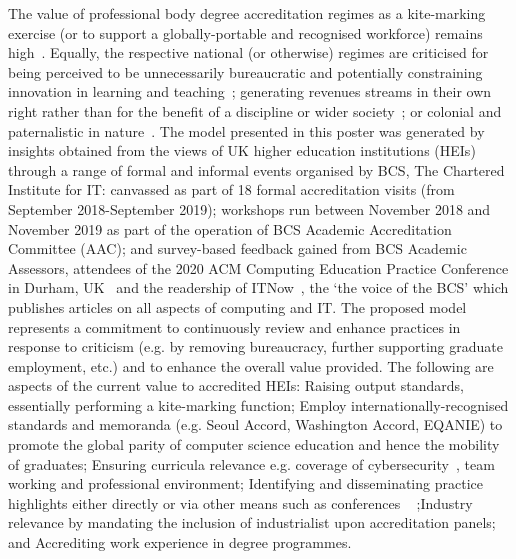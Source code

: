 \documentclass[sigconf]{acmart}
\begin{document}
The value of professional body degree accreditation regimes as a
kite-marking exercise (or to support a globally-portable and
recognised workforce) remains high~\cite{Knight_2015}. Equally, the
respective national (or otherwise) regimes are criticised for being
perceived to be unnecessarily bureaucratic and potentially
constraining innovation in learning and teaching~\cite{Harvey2004};
generating revenues streams in their own right rather than for the
benefit of a discipline or wider society~\cite{Knight_2015}; or
colonial and paternalistic in nature~\cite{Mutereko2017}.  The model
presented in this poster was generated by insights obtained from the
views of UK higher education institutions (HEIs) through a range of
formal and informal events organised by BCS, The Chartered Institute
for IT: canvassed as part of 18 formal accreditation visits (from
September 2018-September 2019); workshops run between November 2018
and November 2019 as part of the operation of BCS Academic
Accreditation Committee (AAC); and survey-based feedback gained from
BCS Academic Assessors, attendees of the 2020 ACM Computing Education
Practice Conference in Durham, UK~\cite{CrickEtAl2020Cep} and the
readership of ITNow~\cite{CrickEtAl2020ITNow}, the `the voice of the
BCS' which publishes articles on all aspects of computing and IT.  The
proposed model represents a commitment to continuously review and
enhance practices in response to criticism (e.g. by removing
bureaucracy, further supporting graduate employment, etc.) and to
enhance the overall value provided. The following are aspects of the
current value to accredited HEIs: Raising output standards, essentially performing a
		kite-marking function; Employ internationally-recognised standards and
		memoranda (e.g. Seoul Accord, Washington Accord, EQANIE) to
		promote the global parity of computer science education and hence the
		mobility of graduates;	Ensuring curricula relevance e.g. coverage of
		cybersecurity~\cite{Cricketal2019}, team working and professional
		environment;
	Identifying and disseminating practice highlights
		either directly \cite{practice_highlights_2020} or via other means
		such as conferences ~\cite{CrickEtAl2020Cep}
	;Industry relevance by mandating the inclusion of
		industrialist upon accreditation panels; 
	and Accrediting work experience in degree programmes.
\end{document}
